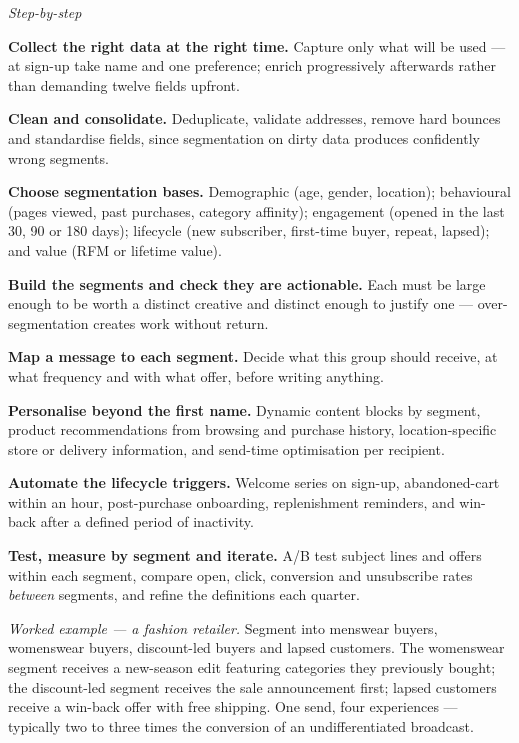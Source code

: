 \begin{qlist}
\textit{Step-by-step}
\begin{apts}
\item \textbf{Collect the right data at the right time.} Capture only what will
      be used --- at sign-up take name and one preference; enrich progressively
      afterwards rather than demanding twelve fields upfront.
\item \textbf{Clean and consolidate.} Deduplicate, validate addresses, remove
      hard bounces and standardise fields, since segmentation on dirty data
      produces confidently wrong segments.
\item \textbf{Choose segmentation bases.} Demographic (age, gender, location);
      behavioural (pages viewed, past purchases, category affinity); engagement
      (opened in the last 30, 90 or 180 days); lifecycle (new subscriber,
      first-time buyer, repeat, lapsed); and value (RFM or lifetime value).
\item \textbf{Build the segments and check they are actionable.} Each must be
      large enough to be worth a distinct creative and distinct enough to
      justify one --- over-segmentation creates work without return.
\item \textbf{Map a message to each segment.} Decide what this group should
      receive, at what frequency and with what offer, before writing anything.
\item \textbf{Personalise beyond the first name.} Dynamic content blocks by
      segment, product recommendations from browsing and purchase history,
      location-specific store or delivery information, and send-time
      optimisation per recipient.
\item \textbf{Automate the lifecycle triggers.} Welcome series on sign-up,
      abandoned-cart within an hour, post-purchase onboarding, replenishment
      reminders, and win-back after a defined period of inactivity.
\item \textbf{Test, measure by segment and iterate.} A/B test subject lines and
      offers within each segment, compare open, click, conversion and
      unsubscribe rates \emph{between} segments, and refine the definitions
      each quarter.
\end{apts}

\textit{Worked example --- a fashion retailer.} Segment into menswear buyers,
womenswear buyers, discount-led buyers and lapsed customers. The womenswear
segment receives a new-season edit featuring categories they previously bought;
the discount-led segment receives the sale announcement first; lapsed customers
receive a win-back offer with free shipping. One send, four experiences ---
typically two to three times the conversion of an undifferentiated broadcast.


\end{qlist}

